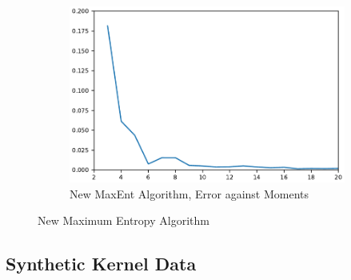\documentclass[letterpaper]{article} %
\begin{document}
\begin{figure}
\begin{subfigure}
		\caption{New MaxEnt Algorithm, Entropy against Moments}
		\label{fig:newmaxentmomentsentropy}
	\end{subfigure}
	\begin{subfigure}%
		\centering
		\includegraphics[width=0.9\linewidth]{errorvsmomentsthermonewcrop}
		\caption{New MaxEnt Algorithm, Error against Moments}
		\label{fig:newsmaxentmomentserror}
	\end{subfigure}
	\caption{New Maximum Entropy Algorithm}
\end{figure}

\subsection{Synthetic Kernel Data}
\end{document}
